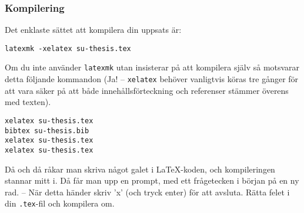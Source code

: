 \subsubsection{Kompilering}

Det enklaste sättet att kompilera din uppsats är:

\begin{verbatim}
latexmk -xelatex su-thesis.tex
\end{verbatim}

\noindent Om du inte använder \texttt{latexmk} utan insisterar på att kompilera
själv så motsvarar detta följande kommandon (Ja! -- \texttt{xelatex} behöver
vanligtvis köras tre gånger för att vara säker på att både innehållsförteckning
och referenser stämmer överens med texten).

\begin{verbatim}
xelatex su-thesis.tex
bibtex su-thesis.bib
xelatex su-thesis.tex
xelatex su-thesis.tex
\end{verbatim}

\noindent Då och då råkar man skriva något galet i \LaTeX-koden, och kompileringen
stannar mitt i. Då får man upp en prompt, med ett frågetecken i början på en ny
rad. -- När detta händer skriv 'x' (och tryck enter) för att avsluta. Rätta
felet i din \texttt{.tex}-fil och kompilera om.



